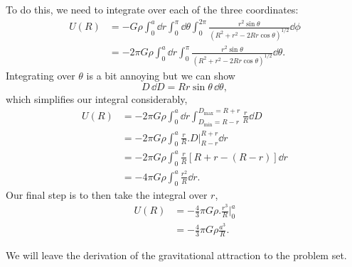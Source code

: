 To do this, we need to integrate over each of the three coordinates:
\begin{align*}
    U(R) &= -G \rho \int_0^a \dd{r} \int_0^\pi \dd{\theta} \int_0^{2\pi} \frac{r^2
        \sin \theta}{(R^2 + r^2 - 2 R r \cos \theta)^{1/2}} \dd{\phi} \\
    &= -2 \pi G \rho \int_0^a \dd{r} \int_0^\pi
        \frac{r^2 \sin \theta}{(R^2 + r^2 - 2 R r \cos \theta)^{1/2}} \dd{\theta} .
\end{align*}
Integrating over $\theta$ is a bit annoying but we can show
\begin{equation*}
    D \,\dd{D} = R r \sin \theta \,\dd{\theta} ,
\end{equation*}
which simplifies our integral considerably,
\begin{align*}
    U(R) &= -2 \pi G \rho \int_0^a \dd{r} \int_{D_{\mathrm{min}} 
        = R - r}^{D_{\mathrm{max}} = R + r} \frac{r}{R} \dd{D} \\
    &= -2 \pi G \rho \int_0^a \frac{r}{R} \Bigg. D \Bigg|_{R - r}^{R + r} \dd{r} \\
    &= -2 \pi G \rho \int_0^a \frac{r}{R} [R + r - (R - r)] \dd{r} \\
    &= -4 \pi G \rho \int_0^a \frac{r^2}{R} \dd{r} .
\end{align*}
Our final step is to then take the integral over $r$,
\begin{align*}
    U(R) &= -\frac{4}{3} \pi G \rho \Bigg. \frac{r^3}{R} \Bigg|_0^a \\
    &= -\frac{4}{3} \pi G \rho \frac{a^3}{R} .
\end{align*}

We will leave the derivation of the gravitational attraction to the problem set.

